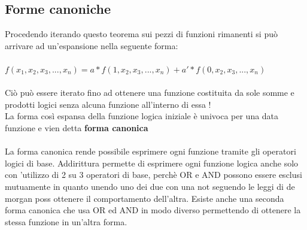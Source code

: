 \documentclass[a4paper]{book}
\begin{document}
\subsection{Forme canoniche}
Procedendo iterando questo teorema sui pezzi di funzioni rimanenti si può arrivare ad un'espansione nella seguente forma:
\\\\
\(f({x_1},{x_2},{x_3},...,{x_n})=a*f(1,{x_2},{x_3},...,{x_n})+a'*f(0,{x_2},{x_3},...,{x_n})\)
\\\\
Ciò può essere iterato fino ad ottenere una funzione costituita da sole somme e prodotti logici senza alcuna funzione all'interno di essa !\\
La forma così espansa della funzione logica iniziale è univoca per una data funzione e vien detta \textbf{forma canonica}\\\\
La forma canonica rende possibile esprimere ogni funzione tramite gli operatori logici di base.
Addirittura permette di esprimere ogni funzione logica anche solo con 'utilizzo di 2 su 3 operatori di base, perchè OR e AND possono essere esclusi mutuamente in quanto unendo uno dei due con una not seguendo le leggi di de morgan poss ottenere il comportamento dell'altra.
Esiste anche una seconda forma canonica che usa OR ed AND in modo diverso permettendo di ottenere la stessa funzione in un'altra forma.

\newpage
\end{document}
